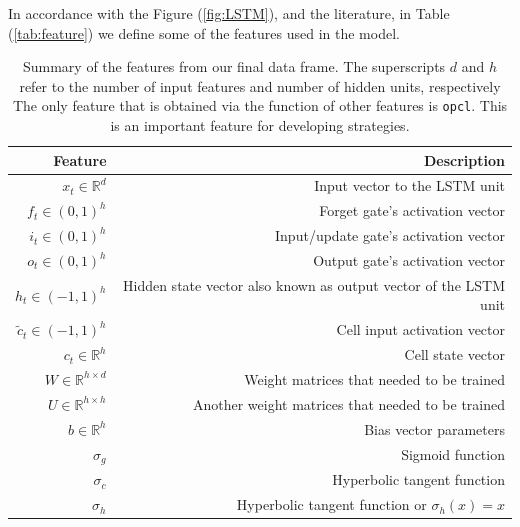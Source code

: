 \documentclass[twoside]{report}
\newcommand{\code}{\texttt}
\begin{document}
\begin{spacing}{1}
In accordance with the Figure (\ref{fig:LSTM}), and the literature, in Table (\ref{tab:feature}) we define some of the features used in the model.
\begin{table}[!htbp]
    \centering
    \begin{tabular}{rr}
    \hline 
    \textbf{Feature} & \textbf{Description} \\
    \hline
    $ x_{t} \in \mathbb{R}^{d}$ & Input vector to the LSTM unit\\
    $f_{t} \in(0,1)^{h}$ & Forget gate's activation vector\\
    $i_{t} \in(0,1)^{h}$ & Input/update gate's activation vector\\
    $o_{t} \in(0,1)^{h}$ & Output gate's activation vector\\
    $h_{t} \in(-1,1)^{h}$ & Hidden state vector also known as output vector of the LSTM unit\\
    $\tilde{c}_{t} \in(-1,1)^{h}$ & Cell input activation vector\\ 
    $c_{t} \in \mathbb{R}^{h}$ & Cell state vector\\
    $W \in \mathbb{R}^{h \times d}$ & Weight matrices that needed to be trained\\
    $U \in \mathbb{R}^{h \times h}$ & Another weight matrices that needed to be trained \\
    $b \in \mathbb{R}^{h}$ & Bias vector parameters \\
    $\sigma_{g}$ & Sigmoid function \\
    $\sigma_{c}$ & Hyperbolic tangent function \\
    $\sigma_{h}$ & Hyperbolic tangent function or  $\sigma_{h}(x)=x$\\
    \hline 
    \end{tabular} \vspace{-0.2mm}
    \caption{Summary of the features from our final data frame. The superscripts $d$ and $h$ refer to the number of input features and number of hidden units, respectively The only feature that is obtained via the function of other features is \code{opcl}. This is an important feature for developing strategies.}
    \label{tab:my_label}
\end{table}


\end{spacing}
\end{document}
